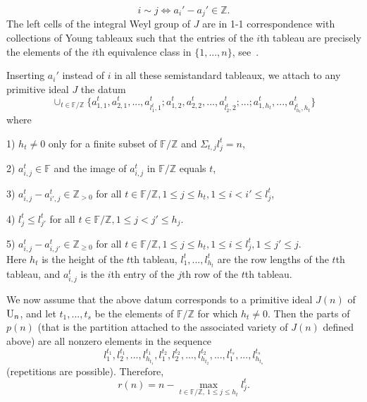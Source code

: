 \documentclass[10pt]{amsart}\oddsidemargin -1mm \evensidemargin -1mm \topmargin -15mm\headheight5mm \headsep 3.5mm \textheight 245mm\textwidth 170mm %
\begin{document}
$$i\sim j\Leftrightarrow a_i'-a_j'\in\mathbb Z.$$
The left cells of the integral Weyl group of $J$ are in 1-1 correspondence with collections of Young tableaux such that the entries of the $i$th tableau are precisely the elements of the $i$th equivalence class in $\{1,..., n\}$, see~\cite[p.~172]{BV1}.

Inserting $a_i'$ instead of $i$ in all these semistandard tableaux, we attach to any primitive ideal $J$ the datum
\begin{equation}\cup_{t\in\mathbb F/\mathbb Z}\{a^t_{1, 1}, a^t_{2, 1}, ..., a^t_{l_1^t, 1}; a^t_{1, 2}, a^t_{2, 2}, ..., a^t_{l_2^t, 2};...; a^t_{1, h_t},..., a^t_{l_{h_t}^t, h_t}\}\label{Eslpack}\end{equation}
where

1) $h_t\ne0$ only for a finite subset of $\mathbb F/\mathbb Z$ and $\Sigma_{t, j} l_j^t=n$,

2) $a^t_{i, j}\in\mathbb F$ and the image of $a^t_{i, j}$ in $\mathbb F/\mathbb Z$ equals $t$,

3) $a^t_{i, j}-a^t_{i', j}\in\mathbb Z_{>0}$ for all $t\in\mathbb F/\mathbb Z, 1\le j\le h_t, 1\le i<i'\le l_j^t$,

4) $l_j^t\le l_{j'}^t$ for all $t\in\mathbb F/\mathbb Z, 1\le j<j'\le h_j$.

5) $a^t_{i, j}-a^t_{i, j'}\in\mathbb Z_{\ge0}$ for all $t\in\mathbb F/\mathbb Z, 1\le j\le h_t, 1\le i\le l_j^t, 1\le j'\le j$.\\
Here $h_t$ is the height of the $t$th tableau, $l_1^t,..., l^t_{h_t}$ are the row lengths of the $t$th tableau, and $a_{i,j}^t$ is the $i$th entry of the $j$th row of the $t$th tableau.

We now assume that the above datum corresponds to a primitive ideal $J(n)$ of $\operatorname{\mathrm{U}}_n$, and let $t_1,..., t_s$ be the elements of $\mathbb F/\mathbb Z$ for which $h_t\ne0$. Then the parts of $p(n)$ (that is the partition attached to the associated variety of $J(n)$ defined above) are all nonzero elements in the sequence$$l_1^{t_1}, l_2^{t_1},..., l_{h_{t_1}}^{t_1}, l_1^{t_2}, l_2^{t_2},..., l_{h_{t_2}}^{t_2},..., l_1^{t_s},..., l_{h_{t_s}}^{t_s}$$(repetitions are possible). Therefore, \begin{equation}\label{Erksl}r(n)=n-\max\limits_{t\in\mathbb F/\mathbb Z,~1\le j\le h_t}l_j^t.\end{equation}
\end{document}
